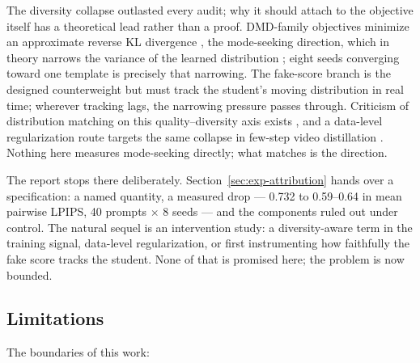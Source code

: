 \documentclass[11pt,a4paper]{article}
\begin{document}
The diversity collapse outlasted every audit; why it should attach to the objective itself has a theoretical lead rather than a proof. DMD-family objectives minimize an approximate reverse KL divergence \cite{dmd1,dmd2}, the mode-seeking direction, which in theory narrows the variance of the learned distribution \cite{fdistill}; eight seeds converging toward one template is precisely that narrowing. The fake-score branch is the designed counterweight but must track the student's moving distribution in real time; wherever tracking lags, the narrowing pressure passes through. Criticism of distribution matching on this quality–diversity axis exists \cite{rcm,piflow}, and a data-level regularization route targets the same collapse in few-step video distillation \cite{dataforcing}. Nothing here measures mode-seeking directly; what matches is the direction.

The report stops there deliberately. Section~\ref{sec:exp-attribution} hands over a specification: a named quantity, a measured drop — 0.732 to 0.59–0.64 in mean pairwise LPIPS, 40 prompts $\times$ 8 seeds — and the components ruled out under control. The natural sequel is an intervention study: a diversity-aware term in the training signal, data-level regularization, or first instrumenting how faithfully the fake score tracks the student. None of that is promised here; the problem is now bounded.

\subsection{Limitations}\label{sec:discussion-limitations}

The boundaries of this work:
\end{document}
